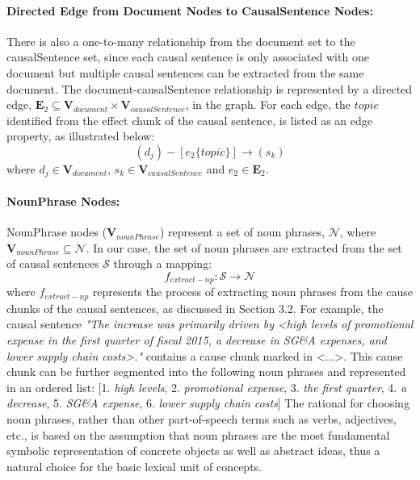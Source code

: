 \documentclass [
     12pt,         %
     a4paper,      %
     BCOR10mm,     %
     DIV14,        %
     liststotoc,   %
     bibtotoc,     %
     idxtotoc,     %
     parskip       %
     ]{scrreprt}
\begin{document}
\paragraph{Directed Edge from Document Nodes to CausalSentence Nodes:} There is also a one-to-many relationship from the document set to the causalSentence set, since each causal sentence is only associated with one document but multiple causal sentences can be extracted from the same document. The document-causalSentence relationship is represented by a directed edge, $\mathbf{E}_2 \subseteq \mathbf{V}_{document} \times \mathbf{V}_{causalSentence}$, in the graph. For each edge, the $topic$ identified from the effect chunk of the causal sentence, is listed as an edge property, as illustrated below:
\[( d_j ) - [ e_2 \{topic\} ]\rightarrow ( s_k ) \] 
where $d_j \in \mathbf{V}_{document}$, $s_k \in \mathbf{V}_{causalSentence}$ and $e_2 \in \mathbf{E}_2$.


\paragraph{NounPhrase Nodes:} NounPhrase nodes ($\mathbf{V}_{nounPhrase}$) represent a set of noun phrases, $\mathbf{\mathcal{N}}$, where $\mathbf{V}_{nounPhrase} \subseteq \mathcal{N}$. In our case, the set of noun phrases are extracted from the set of causal sentences $\mathbf{\mathcal{S}}$ through a mapping: 
\[f_{extract-np}: \mathbf{\mathcal{S}} \rightarrow \mathbf{\mathcal{N}}\] 
where $f_{extract-np}$ represents the process of extracting noun phrases from the cause chunks of the causal sentences, as discussed in Section 3.2. For example, the causal sentence \emph{"The increase was primarily driven by <high levels of promotional expense in the first quarter of fiscal 2015, a decrease in SG\&A expenses, and lower supply chain costs>."} contains a cause chunk marked in <...>. This cause chunk can be further segmented into the following noun phrases and represented in an ordered list:
[1. \emph{high levels}, 2. \emph{promotional expense}, 3. \emph{the first quarter}, 4. \emph{a decrease}, 5. \emph{SG\&A expense}, 6. \emph{lower supply chain costs}]
The rational for choosing noun phrases, rather than other part-of-speech terms such as verbs, adjectives, etc., is based on the assumption that noun phrases are the most fundamental symbolic representation of concrete objects as well as abstract ideas, thus a natural choice for the basic lexical unit of concepts.
\end{document}
